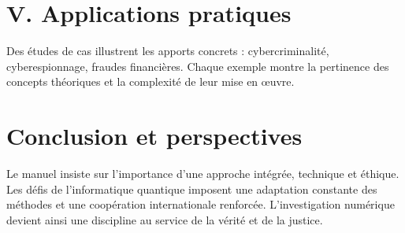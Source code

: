 \documentclass[12pt,a4paper]{article}
\begin{document}
\section*{V. Applications pratiques}
Des études de cas illustrent les apports concrets : cybercriminalité, cyberespionnage, 
fraudes financières. Chaque exemple montre la pertinence des concepts théoriques 
et la complexité de leur mise en œuvre.

\section*{Conclusion et perspectives}
Le manuel insiste sur l’importance d’une approche intégrée, technique et éthique. 
Les défis de l’informatique quantique imposent une adaptation constante des méthodes 
et une coopération internationale renforcée. 
L’investigation numérique devient ainsi une discipline au service de la vérité et de la justice.
\end{document}
